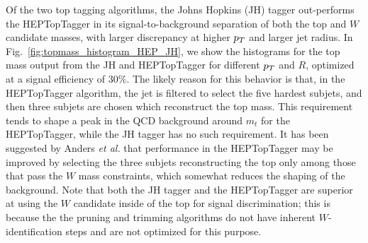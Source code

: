 Of the two top tagging algorithms, the Johns Hopkins (JH) tagger out-performs the HEPTopTagger in its signal-to-background separation of both the top and $W$ candidate masses, with larger discrepancy at higher $p_T$ and larger jet radius. In Fig.~\ref{fig:topmass_histogram_HEP_JH}, we show the histograms for the top mass output from the JH and HEPTopTagger for different $p_T$ and $R$, optimized at a signal efficiency of 30\%. The likely reason for this behavior is that, in the HEPTopTagger algorithm, the jet is filtered to select the five hardest subjets, and then three subjets are chosen which reconstruct the top mass. This requirement tends to shape a peak in the QCD background around $m_t$ for the HEPTopTagger, while the JH tagger has no such requirement. It has been suggested by Anders \emph{et al.} \cite{Anders:2013oga} that performance in the HEPTopTagger may be improved by selecting the three subjets reconstructing the top only among those that pass the $W$ mass constraints, which somewhat reduces the shaping of the background. Note that both the JH tagger and the HEPTopTagger are superior at using the $W$ candidate inside of the top for signal discrimination; this is because the the pruning and trimming algorithms do not have inherent $W$-identification steps and are not optimized for this purpose.

